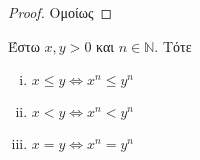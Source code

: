 \documentclass[main.tex]{subfiles}
\begin{document}

\begin{proof}
  Ομοίως
\end{proof}

\begin{lem}\label{lem:ineqs}
  Έστω $ x,y >0 $ και $ n \in \mathbb{N} $. Τότε
  \begin{enumerate}[i)]
    \item $ x \leq y \Leftrightarrow x^{n} \leq y^{n} $
    \item $ x < y \Leftrightarrow x^{n} < y^{n} $ \label{lem:ineqreal2}
    \item $ x = y \Leftrightarrow x^{n} = y^{n} $ \label{lem:ineqreal3}
  \end{enumerate}
\end{lem}

\end{document}
